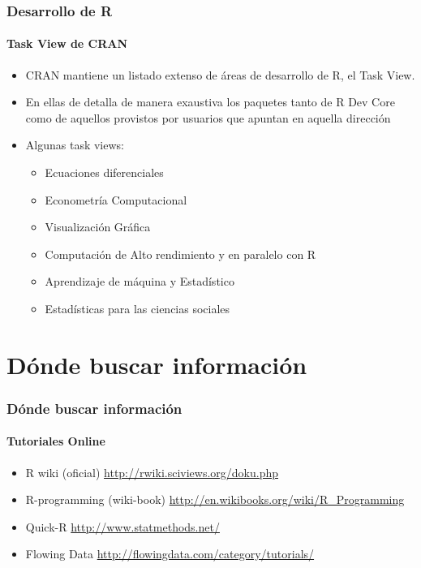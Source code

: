 \documentclass{beamer}\usepackage{graphicx, color}
\begin{document}
\begin{frame}
\frametitle{Desarrollo de R}
\framesubtitle{Task View de CRAN}

\begin{itemize}[<+->]
\item CRAN mantiene un listado extenso de \'areas de desarrollo de R, el Task View.
\item En ellas de detalla de manera exaustiva los paquetes tanto de R Dev Core
como de aquellos provistos por usuarios que apuntan en aquella direcci\'on
\item Algunas task views:
\begin{itemize}
\item Ecuaciones diferenciales
\item Econometr\'ia Computacional
\item Visualizaci\'on Gr\'afica
\item Computaci\'on de Alto rendimiento y en paralelo con R
\item Aprendizaje de m\'aquina y Estad\'istico
\item Estad\'isticas para las ciencias sociales
\end{itemize}
\end{itemize}
\end{frame}




\section{D\'onde buscar informaci\'on}

\begin{frame}
\frametitle{D\'onde buscar informaci\'on}
\framesubtitle{Tutoriales Online}
\begin{itemize}[<+->]
\item R wiki (oficial) \url{http://rwiki.sciviews.org/doku.php}
\item R-programming (wiki-book) \url{http://en.wikibooks.org/wiki/R_Programming}
\item Quick-R \url{http://www.statmethods.net/}
\item Flowing Data \url{http://flowingdata.com/category/tutorials/}
\end{itemize}
\end{frame}
\end{document}
